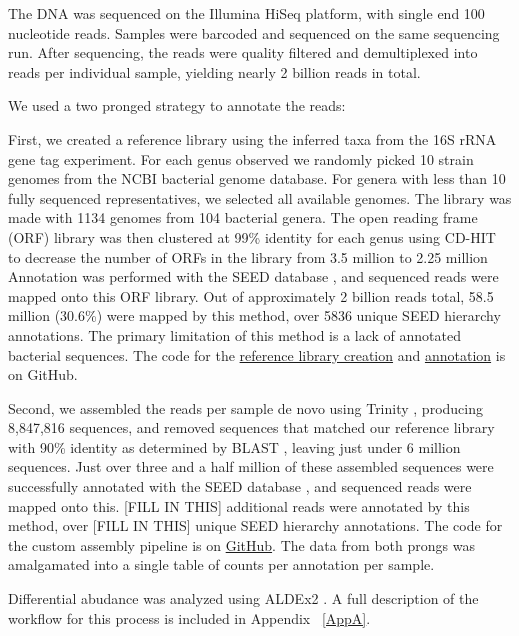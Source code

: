 The DNA was sequenced on the Illumina HiSeq platform, with single end 100 nucleotide reads. Samples were barcoded and sequenced on the same sequencing run. After sequencing, the reads were quality filtered and demultiplexed into reads per individual sample, yielding nearly 2 billion reads in total.

We used a two pronged strategy to annotate the reads:

First, we created a reference library using the inferred taxa from the 16S rRNA gene tag experiment. For each genus observed we randomly picked 10 strain genomes from the NCBI bacterial genome database. For genera with less than 10 fully sequenced representatives, we selected all available genomes. The library was made with 1134 genomes from 104 bacterial genera. The open reading frame (ORF) library was then clustered at 99\% identity for each genus using CD-HIT \cite{li2006cd} to decrease the number of ORFs in the library from 3.5 million to 2.25 million Annotation was performed with the SEED database \cite{overbeek2005subsystems}, and sequenced reads were mapped onto this ORF library. Out of approximately 2 billion reads total, 58.5 million (30.6\%) were mapped by this method, over 5836 unique SEED hierarchy annotations. The primary limitation of this method is a lack of annotated bacterial sequences. The code for the \href{https://github.com/ruthgrace/make_functional_mapping_library}{reference library creation} and \href{https://github.com/ruthgrace/mapping_library_annotated_counts}{annotation} is on GitHub.

Second, we assembled the reads per sample de novo using Trinity \cite{haas2013novo}, producing 8,847,816 sequences, and removed sequences that matched our reference library with 90\% identity as determined by BLAST \cite{altschul1990basic}, leaving just under 6 million sequences. Just over three and a half million of these assembled sequences were successfully annotated with the SEED database \cite{overbeek2005subsystems}, and sequenced reads were mapped onto this. [FILL IN THIS] additional reads were annotated by this method, over [FILL IN THIS] unique SEED hierarchy annotations. The code for the custom assembly pipeline is on \href{https://github.com/ruthgrace/exploring_nafld_assembly}{GitHub}. The data from both prongs was amalgamated into a single table of counts per annotation per sample.

Differential abudance was analyzed using ALDEx2 \cite{fernandes2014unifying}. A full description of the workflow for this process is included in Appendix ~\ref{AppA}.

